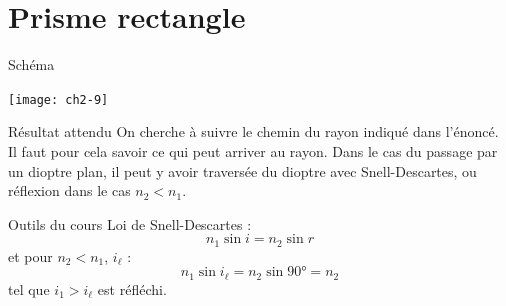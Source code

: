 \documentclass[../main/main.tex]{subfiles}
\begin{document}
\section{Prisme rectangle}
\begin{tcbraster}[raster columns=3, raster equal height=rows]
    \begin{NCdefi}[raster multicolumn=2]{Schéma}
        \begin{center}
            \texttt{[image: ch2-9]}
        \end{center}
    \end{NCdefi}
    \begin{tcolorbox}[blankest, raster multicolumn=1, space to=\myspace]
        \begin{tcbraster}[raster columns=1]
            \begin{NCprop}[]{Résultat attendu}
                On cherche à suivre le chemin du rayon indiqué dans l'énoncé. Il
                faut pour cela savoir ce qui peut arriver au rayon. Dans le cas
                du passage par un dioptre plan, il peut y avoir traversée du
                dioptre avec Snell-Descartes, ou réflexion dans le cas $n_2 <
                n_1$.
            \end{NCprop}
            \begin{NCdemo}{Outils du cours}
                Loi de Snell-Descartes :
                \[ n_1\sin i = n_2\sin r\]
                et pour $n_2 < n_1$, $i_\ell$ :
                \[ n_1\sin i_\ell = n_2\sin \ang{90;;} = n_2\]
                tel que $i_1 > i_\ell$ est réfléchi.
            \end{NCdemo}
        \end{tcbraster}
    \end{tcolorbox}
\end{tcbraster}
\end{document}
